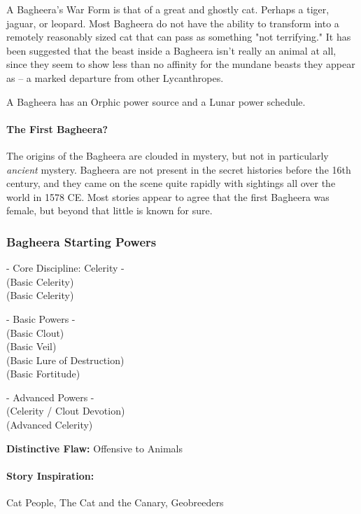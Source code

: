 A Bagheera's War Form is that of a great and ghostly cat. Perhaps a tiger, jaguar, or leopard. Most Bagheera do not have the ability to transform into a remotely reasonably sized cat that can pass as something "not terrifying." It has been suggested that the beast inside a Bagheera isn't really an animal at all, since they seem to show less than no affinity for the mundane beasts they appear as -- a marked departure from other Lycanthropes.

A Bagheera has an Orphic power source and a Lunar power schedule.

\paragraph{The First Bagheera?} The origins of the Bagheera are clouded in mystery, but not in particularly \textit{ancient} mystery. Bagheera are not present in the secret histories before the 16th century, and they came on the scene quite rapidly with sightings all over the world in 1578 CE. Most stories appear to agree that the first Bagheera was female, but beyond that little is known for sure.

\subsubsection{Bagheera Starting Powers}

\hspace{\parindent} - Core Discipline: Celerity -\\
 (Basic Celerity)\\
 (Basic Celerity)

- Basic Powers -\\
 (Basic Clout)\\
 (Basic Veil)\\
 (Basic Lure of Destruction)\\
 (Basic Fortitude)

- Advanced Powers -\\
 (Celerity / Clout Devotion)\\
 (Advanced Celerity)

\textbf{Distinctive Flaw:} Offensive to Animals

\paragraph{Story Inspiration:} Cat People, The Cat and the Canary, Geobreeders

